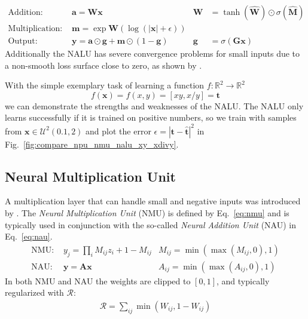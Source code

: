 \documentclass[9pt]{article}
\begin{document}
\begin{align}
  \label{eq:nalu_add}
  \text{Addition: }       & \bm a = \bm W \bm x
                          & \bm W& = \tanh(\hat{\bm W}) \odot \sigma(\hat{\bm M}) \\
  \label{eq:nalu_mult}
  \text{Multiplication: } & \bm m = \exp \bm W(\log(|\bm x|+\epsilon)) & &\\
  \text{Output: }         & \bm y = \bm a \odot \bm g + \bm m \odot (1-\bm g) 
                          & \bm g& = \sigma(\bm G\bm x)
\end{align}
Additionally the NALU has severe convergence problems for small inputs due to
a non-smooth loss surface close to zero, as shown by \cite{madsen_neural_2020}.

With the simple exemplary task of learning a function $f:\mathbb R^2 \rightarrow \mathbb R^2$
\begin{equation}
  \label{eq:xx_xdivy}
  f(\bm x) = f(x,y) = [xy,x/y] = \bm t
\end{equation}
we can demonstrate the strengths and weaknesses of the NALU.  The NALU only
learns successfully if it is trained on positive numbers, so we train with
samples from $\bm x \in \mathcal U^2(0.1,2)$ and plot the error $\epsilon =
|\bm t - \hat{\bm t}|^2$ in Fig.~\ref{fig:compare_npu_nmu_nalu_xy_xdivy}.


\subsection{Neural Multiplication Unit}%
\label{sub:neural_multiplication_unit}

A multiplication layer that can handle small and negative inputs was introduced
by \citet{madsen_neural_2020}.  The \emph{Neural Multiplication Unit} (NMU) is
defined by Eq.~\ref{eq:nmu} and is typically used in conjunction with the
so-called \emph{Neural Addition Unit} (NAU) in Eq.~\ref{eq:nau}.
\begin{align}
  \label{eq:nmu}
  \text{NMU: } &y_j = \prod_i M_{ij} z_{i} + 1 - M_{ij}  &M_{ij}=\min(\max(M_{ij}, 0), 1)\\
  \label{eq:nau}
  \text{NAU: } &\bm y = \bm A \bm x &A_{ij}=\min(\max(A_{ij}, 0), 1)
\end{align}
In both NMU and NAU the weights are clipped to $[0,1]$, and typically regularized
with $\mathcal{R}$:
\begin{align}
  \label{eq:rsparse}
  \mathcal{R} = \sum_{ij} \min(W_{ij}, 1-W_{ij})
\end{align}
\end{document}
